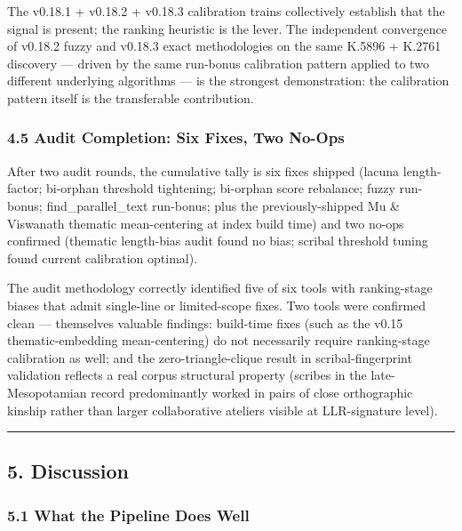 \documentclass[
  11pt,
  letterpaper,
]{article}
\begin{document}
The v0.18.1 + v0.18.2 + v0.18.3 calibration trains collectively
establish that the signal is present; the ranking heuristic is the
lever. The independent convergence of v0.18.2 fuzzy and v0.18.3 exact
methodologies on the same K.5896 + K.2761 discovery --- driven by the
same run-bonus calibration pattern applied to two different underlying
algorithms --- is the strongest demonstration: the calibration pattern
itself is the transferable contribution.

\subsubsection{4.5 Audit Completion: Six Fixes, Two
No-Ops}\label{audit-completion-six-fixes-two-no-ops}

After two audit rounds, the cumulative tally is six fixes shipped
(lacuna length-factor; bi-orphan threshold tightening; bi-orphan score
rebalance; fuzzy run-bonus; find\_parallel\_text run-bonus; plus the
previously-shipped Mu \& Viswanath thematic mean-centering at index
build time) and two no-ops confirmed (thematic length-bias audit found
no bias; scribal threshold tuning found current calibration optimal).

The audit methodology correctly identified five of six tools with
ranking-stage biases that admit single-line or limited-scope fixes. Two
tools were confirmed clean --- themselves valuable findings: build-time
fixes (such as the v0.15 thematic-embedding mean-centering) do not
necessarily require ranking-stage calibration as well; and the
zero-triangle-clique result in scribal-fingerprint validation reflects a
real corpus structural property (scribes in the late-Mesopotamian record
predominantly worked in pairs of close orthographic kinship rather than
larger collaborative ateliers visible at LLR-signature level).

\begin{center}\rule{0.5\linewidth}{0.5pt}\end{center}

\subsection{5. Discussion}\label{discussion}

\subsubsection{5.1 What the Pipeline Does
Well}\label{what-the-pipeline-does-well}
\end{document}
